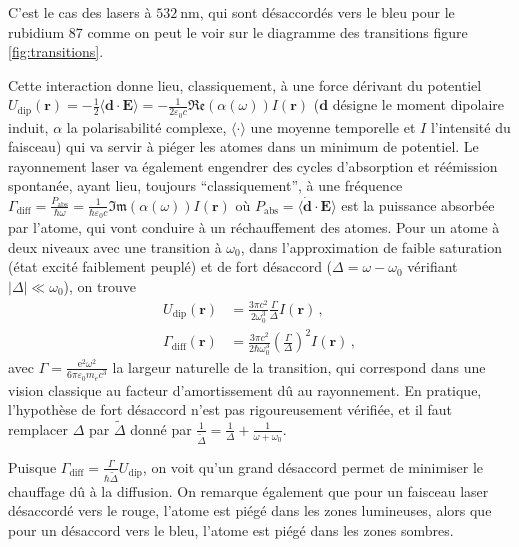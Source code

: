 \documentclass[11pt,a4paper]{article}
\newcommand{\lmbd}[1]{$\SI{#1}{\nano\metre}$}
\newcommand{\e}[1]{\text{e}^{#1}}
\newcommand{\mathsc}[1]{\mathrm{\scriptscriptstyle {#1}}}
\renewcommand{\v}[1]{\boldsymbol{\mathbf{#1}}}
\begin{document}
C'est le cas des lasers à \lmbd{532}, qui sont désaccordés vers le bleu pour le rubidium 87 comme on peut le voir sur le diagramme des transitions figure \ref{fig:transitions}.

Cette interaction donne lieu, classiquement, à une force dérivant du potentiel $U_\mathsc{dip}(\v r) = {-\frac12 \langle \v d \cdot \v E \rangle} = -\frac{1}{2\varepsilon_0 c}\mathfrak{Re}\left(\alpha(\omega)\right) I(\v r)$ ($\v d$ désigne le moment dipolaire induit, $\alpha$ la polarisabilité complexe, $\langle \cdot \rangle$ une moyenne temporelle et $I$ l'intensité du faisceau)
qui va servir à piéger les atomes dans un minimum de potentiel. Le rayonnement laser va également engendrer des cycles d'absorption et réémission spontanée, ayant lieu, toujours ``classiquement'', à une fréquence $\Gamma_\mathsc{diff} = \frac{P_\mathsc{abs}}{\hbar \omega} = \frac{1}{\hbar \varepsilon_0 c} \mathfrak{Im}\left(\alpha(\omega)\right) I(\v r)$ où $P_\mathsc{abs} = \langle \dot{\v d} \cdot \v E \rangle$ est la puissance absorbée par l'atome, qui vont conduire à un réchauffement des atomes. 
Pour un atome à deux niveaux avec une transition à $\omega_0$, dans l'approximation de faible saturation (état excité faiblement peuplé) et de fort désaccord ($\Delta = \omega - \omega_0$ vérifiant $|\Delta| \ll \omega_0$), on trouve %
\vspace{-0.2cm}
\begin{align}
	U_\mathsc{dip}(\v r)&=\frac{3\pi c^2}{2\omega_0^3} \frac{\Gamma}{\Delta} I(\v r) \,, \\
	\Gamma_\mathsc{diff}(\v r)&=\frac{3\pi c^2}{2\hbar\omega_0^3} \left(\frac{\Gamma}{\Delta}\right)^2 I(\v r) \,,
\end{align}
avec $\Gamma = \frac{\e 2 \omega^2}{6 \pi \varepsilon_0 m_e c^3}$ la largeur naturelle de la transition, qui correspond dans une vision classique au facteur d'amortissement dû au rayonnement. En pratique, l'hypothèse de fort désaccord n'est pas rigoureusement vérifiée, et il faut remplacer $\Delta$ par $\widetilde{\Delta}$ donné par $\frac{1}{\widetilde{\Delta}} = \frac1\Delta + \frac{1}{\omega+\omega_0}$.

Puisque $\Gamma_\mathsc{diff}=\frac{\Gamma}{\hbar \widetilde{\Delta}} U_\mathsc{dip}$, on voit qu'un grand désaccord permet de minimiser le chauffage dû à la diffusion. On remarque également que pour un faisceau laser désaccordé vers le rouge, l'atome est piégé dans les zones lumineuses, alors que pour un désaccord vers le bleu, l'atome est piégé dans les zones sombres.
\end{document}
